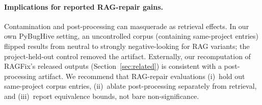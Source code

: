 \paragraph{Implications for reported RAG-repair gains.} Contamination and
post-processing can masquerade as retrieval effects. In our own PyBugHive
setting, an uncontrolled corpus (containing same-project entries) flipped
results from neutral to strongly negative-looking for RAG variants; the
project-held-out control removed the artifact. Externally, our recomputation
of RAGFix's released outputs (Section~\ref{sec:related}) is consistent with a
post-processing artifact. We recommend that RAG-repair evaluations
(i)~hold out same-project corpus entries, (ii)~ablate post-processing
separately from retrieval, and (iii)~report equivalence bounds, not bare
non-significance.
